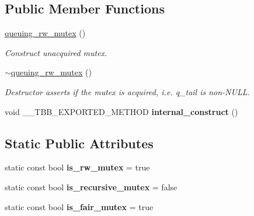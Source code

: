 \subsection*{Public Member Functions}
\begin{DoxyCompactItemize}
\item 
\hypertarget{classtbb_1_1queuing__rw__mutex_a23de1ac415b6f54b778c8fd6ec6073e0}{}\hyperlink{classtbb_1_1queuing__rw__mutex_a23de1ac415b6f54b778c8fd6ec6073e0}{queuing\+\_\+rw\+\_\+mutex} ()\label{classtbb_1_1queuing__rw__mutex_a23de1ac415b6f54b778c8fd6ec6073e0}

\begin{DoxyCompactList}\small\item\em Construct unacquired mutex. \end{DoxyCompactList}\item 
\hypertarget{classtbb_1_1queuing__rw__mutex_ae67fe828d7e07222e7876ef9fd780fcc}{}\hyperlink{classtbb_1_1queuing__rw__mutex_ae67fe828d7e07222e7876ef9fd780fcc}{$\sim$queuing\+\_\+rw\+\_\+mutex} ()\label{classtbb_1_1queuing__rw__mutex_ae67fe828d7e07222e7876ef9fd780fcc}

\begin{DoxyCompactList}\small\item\em Destructor asserts if the mutex is acquired, i.\+e. q\+\_\+tail is non-\/\+N\+U\+L\+L. \end{DoxyCompactList}\item 
\hypertarget{classtbb_1_1queuing__rw__mutex_af0d7ca1c9b3aeb7d16baf16e0da3ce6a}{}void \+\_\+\+\_\+\+T\+B\+B\+\_\+\+E\+X\+P\+O\+R\+T\+E\+D\+\_\+\+M\+E\+T\+H\+O\+D {\bfseries internal\+\_\+construct} ()\label{classtbb_1_1queuing__rw__mutex_af0d7ca1c9b3aeb7d16baf16e0da3ce6a}

\end{DoxyCompactItemize}
\subsection*{Static Public Attributes}
\begin{DoxyCompactItemize}
\item 
\hypertarget{classtbb_1_1queuing__rw__mutex_ae3dbfbf71bfa9c662a59688cd86bfbd7}{}static const bool {\bfseries is\+\_\+rw\+\_\+mutex} = true\label{classtbb_1_1queuing__rw__mutex_ae3dbfbf71bfa9c662a59688cd86bfbd7}

\item 
\hypertarget{classtbb_1_1queuing__rw__mutex_ae8c3ee1f5ab3af3954abeec1d165ea8e}{}static const bool {\bfseries is\+\_\+recursive\+\_\+mutex} = false\label{classtbb_1_1queuing__rw__mutex_ae8c3ee1f5ab3af3954abeec1d165ea8e}

\item 
\hypertarget{classtbb_1_1queuing__rw__mutex_a4704d512922b4b5d21c97901f9f7abd0}{}static const bool {\bfseries is\+\_\+fair\+\_\+mutex} = true\label{classtbb_1_1queuing__rw__mutex_a4704d512922b4b5d21c97901f9f7abd0}

\end{DoxyCompactItemize}


